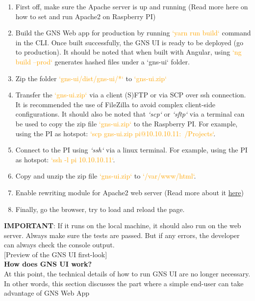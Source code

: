 \begin{enumerate}
    \item First off, make sure the Apache server is up and running (Read more here on how to set and run Apache2 on Raspberry PI)
    \item Build the GNS Web app for production by running \textcolor{orange}{`yarn run build`} command in the CLI. Once built successfully, the GNS UI is ready to be deployed (go to production). It should be noted that when built with Angular, using \textcolor{orange}{`ng build --prod`} generates hashed files under a `gns-ui` folder.
    \item Zip the folder \textcolor{orange}{`gns-ui/dist/gns-ui/*`} to \textcolor{orange}{`gns-ui.zip`}
    \item Transfer the \textcolor{orange}{`gns-ui.zip`} via a client (S)FTP or via SCP over ssh connection. It is recommended the use of FileZilla to avoid complex client-side configurations. It should also be noted that \textit{`scp`} or \textit{`sftp`} via a terminal can be used to copy the zip file \textcolor{orange}{`gns-ui.zip`} to the Raspberry PI. For example, using the PI as hotspot: \textcolor{orange}{`scp gns-ui.zip pi@10.10.10.11:~/Projects`}.
    \item Connect to the PI using \textit{`ssh`} via a linux terminal. For example, using the PI as hotspot: \textcolor{orange}{`ssh -l pi 10.10.10.11`}.
    \item Copy and unzip the zip file \textcolor{orange}{`gns-ui.zip`} to \textcolor{orange}{`/var/www/html`}.
    \item Enable rewriting module for Apache2 web server (Read more about it \href{https://www.digitalocean.com/community/tutorials/how-to-rewrite-urls-with-mod_rewrite-for-apache-on-ubuntu-16-04}{here})
    \item Finally, go the browser, try to load and reload the page.
\end{enumerate}

\noindent
\textbf{IMPORTANT}: If it runs on the local machine, it should also run on the web server. Always make sure the tests are passed. But if any errors, the developer can always check the console output.\\

[Preview of the GNS UI first-look]\\

\noindent
\textbf{How does GNS UI work?}\\
At this point, the technical details of how to run GNS UI are no longer necessary. In other words, this section discusses the part where a simple end-user can take advantage of GNS Web App
